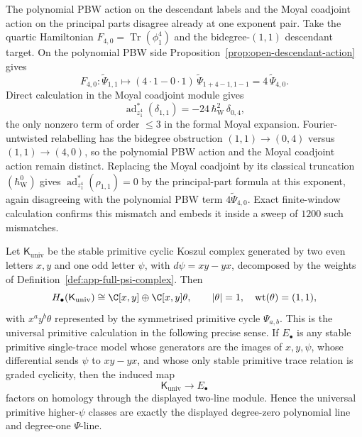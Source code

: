 \begin{rmk}[Smallest explicit mismatch: \((p,q,a,b)=(4,0,1,1)\)]
\label{rmk:app-full-instant-computation}
  The polynomial PBW action on the descendant labels and the Moyal
  coadjoint action on the principal parts disagree already at one
  exponent pair.  Take the quartic
  Hamiltonian \(F_{4,0}=\operatorname{Tr}(\phi_1^4)\) and the
  bidegree-\((1,1)\) descendant target.  On the polynomial PBW side
  Proposition~\ref{prop:open-descendant-action} gives
  \[
    F_{4,0}:\widetilde\Psi_{1,1}\longmapsto
      (4\cdot1-0\cdot1)\,\widetilde\Psi_{1+4-1,1-1}
      =4\,\widetilde\Psi_{4,0}.
  \]
  Direct calculation in the Moyal coadjoint module gives
  \[
    \operatorname{ad}^*_{z_1^4}(\delta_{1,1})
      =-24\,\hbar_{\mathrm{W}}^2\,\delta_{0,4},
  \]
  the only nonzero term of order \(\leq3\) in the formal Moyal expansion.
  Fourier-untwisted relabelling has the bidegree obstruction
  \((1,1)\to(0,4)\) versus \((1,1)\to(4,0)\), so the polynomial PBW action
  and the Moyal coadjoint action remain distinct.  Replacing the Moyal coadjoint by its classical
  truncation \((\hbar_{\mathrm{W}}^0)\) gives
  \(\operatorname{ad}^*_{z_1^4}(\rho_{1,1})=0\) by the principal-part
  formula at this exponent, again disagreeing with the polynomial PBW
  term \(4\widetilde\Psi_{4,0}\).  Exact finite-window calculation
  confirms this mismatch and embeds it inside a sweep of \(1200\) such
  mismatches.
\end{rmk}

\begin{thm}
\label{thm:app-full-universal-primitive-descendant}
  Let \(\mathsf K_{\mathrm{univ}}\) be the stable primitive cyclic Koszul
  complex generated by two even letters \(x,y\) and one odd letter
  \(\psi\), with \(d\psi=xy-yx\), decomposed by the weights of
  Definition~\ref{def:app-full-psi-complex}.  Then
  \[
    H_\bullet(\mathsf K_{\mathrm{univ}})
      \cong
      \C[x,y]\oplus\C[x,y]\theta,\qquad
      |\theta|=1,\quad\operatorname{wt}(\theta)=(1,1),
  \]
  with \(x^ay^b\theta\) represented by the symmetrised primitive cycle
  \(\Psi_{a,b}\).  This is the universal primitive calculation in the
  following precise sense.  If \(E_\bullet\) is any stable primitive
  single-trace model whose generators are the images of \(x,y,\psi\), whose
  differential sends \(\psi\) to \(xy-yx\), and whose only stable primitive
  trace relation is graded cyclicity, then the induced map
  \[
    \mathsf K_{\mathrm{univ}}\longrightarrow E_\bullet
  \]
  factors on homology through the displayed two-line module.  Hence the
  universal primitive higher-\(\psi\) classes are exactly the displayed
  degree-zero polynomial line and degree-one \(\Psi\)-line.
\end{thm}

